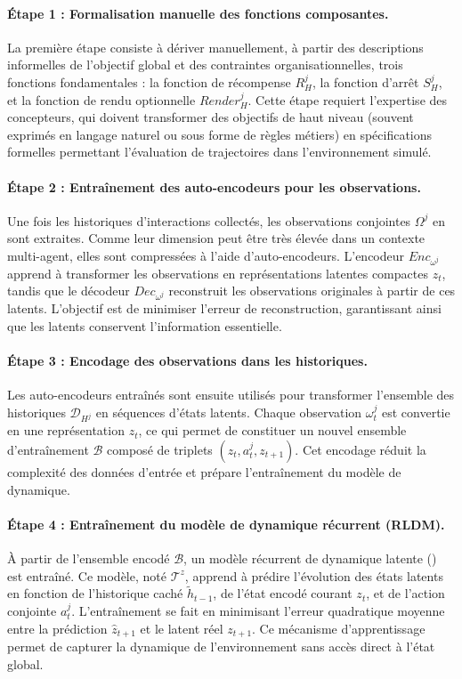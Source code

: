 \paragraph{Étape 1 : Formalisation manuelle des fonctions composantes.}
La première étape consiste à dériver manuellement, à partir des descriptions informelles de l'objectif global et des contraintes organisationnelles, trois fonctions fondamentales : la fonction de récompense $R^j_H$, la fonction d'arrêt $S^j_H$, et la fonction de rendu optionnelle $Render^j_H$.
Cette étape requiert l'expertise des concepteurs, qui doivent transformer des objectifs de haut niveau (souvent exprimés en langage naturel ou sous forme de règles métiers) en spécifications formelles permettant l'évaluation de trajectoires dans l'environnement simulé.

\paragraph{Étape 2 : Entraînement des auto-encodeurs pour les observations.}
Une fois les historiques d'interactions collectés, les observations conjointes $\Omega^j$ en sont extraites.
Comme leur dimension peut être très élevée dans un contexte multi-agent, elles sont compressées à l'aide d'auto-encodeurs.
L'encodeur $Enc_{\omega^j}$ apprend à transformer les observations en représentations latentes compactes $z_t$, tandis que le décodeur $Dec_{\omega^j}$ reconstruit les observations originales à partir de ces latents.
L'objectif est de minimiser l'erreur de reconstruction, garantissant ainsi que les latents conservent l'information essentielle.

\paragraph{Étape 3 : Encodage des observations dans les historiques.}
Les auto-encodeurs entraînés sont ensuite utilisés pour transformer l'ensemble des historiques $\mathcal{D}_{H^j}$ en séquences d'états latents.
Chaque observation $\omega_t^j$ est convertie en une représentation $z_t$, ce qui permet de constituer un nouvel ensemble d'entraînement $\mathcal{B}$ composé de triplets $(z_t, a_t^j, z_{t+1})$.
Cet encodage réduit la complexité des données d'entrée et prépare l'entraînement du modèle de dynamique.

\paragraph{Étape 4 : Entraînement du modèle de dynamique récurrent (RLDM).}
À partir de l'ensemble encodé $\mathcal{B}$, un modèle récurrent de dynamique latente () est entraîné.
Ce modèle, noté $\mathcal{T}^z$, apprend à prédire l'évolution des états latents en fonction de l'historique caché $\tilde{h}_{t-1}$, de l'état encodé courant $z_t$, et de l'action conjointe $a_t^j$.
L'entraînement se fait en minimisant l'erreur quadratique moyenne entre la prédiction $\hat{z}_{t+1}$ et le latent réel $z_{t+1}$.
Ce mécanisme d'apprentissage permet de capturer la dynamique de l'environnement sans accès direct à l'état global.


